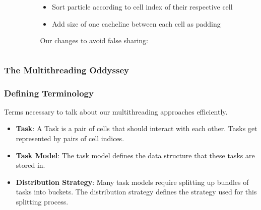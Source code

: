 \begin{frame}
\begin{columns}
\begin{column}{0.5\textwidth}
\end{column}

\begin{column}{0.5\textwidth}
	\vspace{-4cm}
	
	\begin{itemize}
		\item Sort particle according to cell index of their respective cell
		\item Add size of one cacheline between each cell as padding
	\end{itemize}

	\vspace{-4cm}
	Our changes to avoid false sharing:
\end{column}
\end{columns}
\end{frame}

\begin{frame}
	\frametitle{The Multithreading Oddyssey}
	\PraesentationBildUhrenturm
\end{frame}

\begin{frame}
	\frametitle{Defining Terminology}
	\large
	Terms necessary to talk about our multithreading approaches efficiently.
	\begin{itemize}
		\item \textbf{Task}: A Task is a pair of cells that should interact with each other. Tasks get represented by pairs of cell indices.
		\item \textbf{Task Model}: The task model defines the data structure that these tasks are stored in.
		\item \textbf{Distribution Strategy}: Many task models require splitting up bundles of tasks into buckets. The distribution strategy defines the strategy used for this splitting process.
	\end{itemize}
\end{frame}


